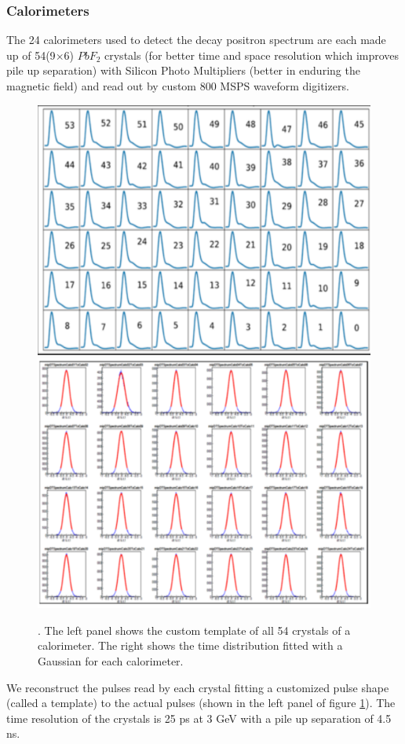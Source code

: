 \documentclass[journal,article,submit,moreauthors,pdftex,10pt,a4paper]{Definitions/mdpi}
\begin{document}
\subsubsection{Calorimeters}
The 24 calorimeters used to detect the decay positron spectrum are each made up of 
54(9$\times$6) $PbF_2$ crystals (for better time and space resolution which 
improves pile up separation) with Silicon Photo Multipliers (better in
enduring the magnetic field) and read out by custom 800 MSPS waveform
digitizers. 
\begin{figure}[H]
\centering
\includegraphics[width=7 cm]{template.pdf}
\includegraphics[width=7 cm]{time_res.pdf}
\caption{\label{fig6}. The left panel shows the custom template of all 54 crystals of a calorimeter. 
The right shows the time distribution fitted with a Gaussian for each calorimeter.}
\end{figure}
We reconstruct the pulses read by each crystal fitting a customized pulse shape (called a template) 
to the actual pulses (shown in the left panel of figure \ref{fig6}). 
The time resolution of the crystals is 25 ps at 3 GeV with a pile up separation of 4.5 ns. 
\end{document}
